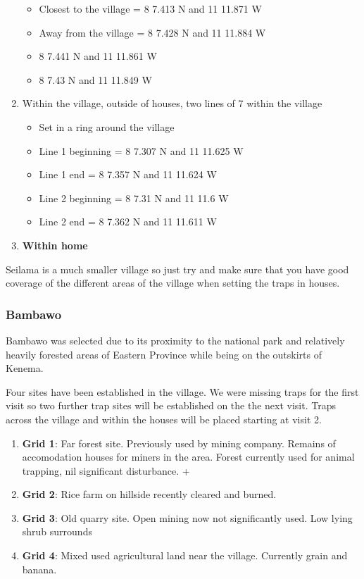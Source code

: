 \documentclass[
]{article}
\providecommand{\tightlist}{%
  \setlength{\itemsep}{0pt}\setlength{\parskip}{0pt}}
\begin{document}
\begin{enumerate}
  \begin{itemize}
  \tightlist
  \item
    Closest to the village = 8 7.413 N and 11 11.871 W
  \item
    Away from the village = 8 7.428 N and 11 11.884 W
  \item
    8 7.441 N and 11 11.861 W
  \item
    8 7.43 N and 11 11.849 W
  \end{itemize}
\item
  Within the village, outside of houses, two lines of 7 within the
  village

  \begin{itemize}
  \tightlist
  \item
    Set in a ring around the village
  \item
    Line 1 beginning = 8 7.307 N and 11 11.625 W
  \item
    Line 1 end = 8 7.357 N and 11 11.624 W
  \item
    Line 2 beginning = 8 7.31 N and 11 11.6 W
  \item
    Line 2 end = 8 7.362 N and 11 11.611 W
  \end{itemize}
\item
  \textbf{Within home}
\end{enumerate}

Seilama is a much smaller village so just try and make sure that you
have good coverage of the different areas of the village when setting
the traps in houses.

\hypertarget{bambawo}{%
\subsubsection{Bambawo}\label{bambawo}}

Bambawo was selected due to its proximity to the national park and
relatively heavily forested areas of Eastern Province while being on the
outskirts of Kenema.

Four sites have been established in the village. We were missing traps
for the first visit so two further trap sites will be established on the
the next visit. Traps across the village and within the houses will be
placed starting at visit 2.

\begin{enumerate}
\def\labelenumi{\arabic{enumi}.}
\tightlist
\item
  \textbf{Grid 1}: Far forest site. Previously used by mining company.
  Remains of accomodation houses for miners in the area. Forest
  currently used for animal trapping, nil significant disturbance. +
\item
  \textbf{Grid 2}: Rice farm on hillside recently cleared and burned.
\item
  \textbf{Grid 3}: Old quarry site. Open mining now not significantly
  used. Low lying shrub surrounds
\item
  \textbf{Grid 4}: Mixed used agricultural land near the village.
  Currently grain and banana.
\end{enumerate}
\end{document}
